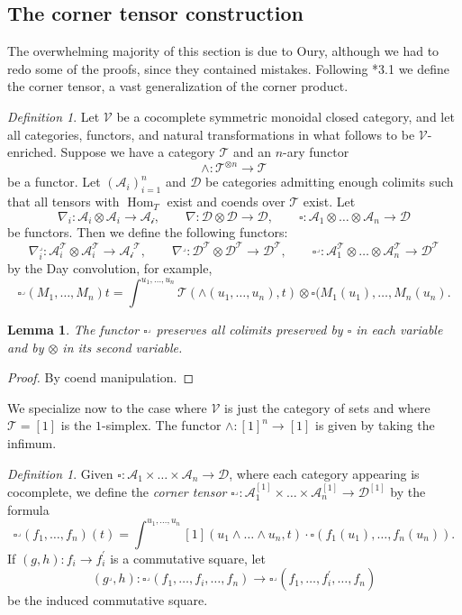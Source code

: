 \documentclass[leqno]{article}
\numberwithin{equation}{subsection}
\theoremstyle{plain}   %
\newtheorem{lemma}[equation]{Lemma}
\theoremstyle{remark}
\newtheorem{defn}[equation]{Definition}
\theoremstyle{plain}
\DeclareMathOperator{\Hom}{Hom}
\begin{document}
\subsection{The corner tensor construction}\label{cornertensor} 
The overwhelming majority of this section is due to Oury, although we had to redo some of the proofs, since they contained mistakes. Following \cite{oury}*{3.1} we define the corner tensor, a vast generalization of the corner product.
\begin{defn}
	Let \(\mathcal{V}\) be a cocomplete symmetric monoidal closed category, and let all categories, functors, and natural transformations in what follows to be \(\mathcal{V}\)-enriched.  Suppose we have a category \(\mathcal{T}\) and an \(n\)-ary functor \[\wedge:\mathcal{T}^{\otimes n} \to \mathcal{T}\] be a functor.  Let \((\mathcal{A}_i)_{i=1}^n\) and \(\mathcal{D}\) be categories admitting enough colimits such that all tensors with \(\Hom_T\) exist and coends over \(\mathcal{T}\) exist.  Let
	\[\nabla_i: \mathcal{A}_i \otimes \mathcal{A}_i \to \mathcal{A_i}, \qquad \nabla:\mathcal{D}\otimes \mathcal{D} \to \mathcal{D}, \qquad \square:\mathcal{A}_1\otimes\dots \otimes \mathcal{A}_n \to \mathcal{D}\]
	be functors.  Then we define the following functors:
	\[\nabla^\lrcorner_i: \mathcal{A}^\mathcal{T}_i \otimes \mathcal{A}^\mathcal{T}_i \to \mathcal{A_i}^\mathcal{T}, \qquad \nabla^\lrcorner:\mathcal{D}^\mathcal{T}\otimes \mathcal{D}^\mathcal{T} \to \mathcal{D}^\mathcal{T}, \qquad \square^\lrcorner: \mathcal{A}_1^\mathcal{T}\otimes\dots \otimes \mathcal{A}_n^\mathcal{T} \to \mathcal{D}^\mathcal{T}\]
	by the Day convolution, for example,
	\[\square^\lrcorner(M_1,\dots,M_n)t = \int^{u_1,\dots,u_n} \mathcal{T}(\wedge(u_1,\dots,u_n),t) \otimes \square(M_1(u_1),\dots,M_n(u_n).\]
\end{defn}
\begin{lemma}
	The functor \(\square^\lrcorner\) preserves all colimits preserved by \(\square\) in each variable and by \(\otimes\) in its second variable.  
\end{lemma}
\begin{proof} By coend manipulation.
\end{proof}
We specialize now to the case where \(\mathcal{V}\) is just the category of sets and where \(\mathcal{T}=[1]\) is the \(1\)-simplex.  The functor \(\wedge:[1]^n \to [1]\) is given by taking the infimum.   
\begin{defn}
	Given \(\square:\mathcal{A}_1\times \dots \times \mathcal{A}_n \to \mathcal{D}\), where each category appearing is cocomplete, we define the \emph{corner tensor} \(\square^\lrcorner:\mathcal{A}_1^{[1]}\times \dots \times \mathcal{A}_n^{[1]} \to \mathcal{D}^{[1]}\) by the formula
	\[\square^\lrcorner(f_1,\dots,f_n)(t)=\int^{u_1,\dots,u_n} [1](u_1\wedge\dots\wedge u_n, t) \cdot \square(f_1(u_1),\dots,f_n(u_n)).\]
	If \((g,h): f_i\to f^\prime_i\) is a commutative square, let 
	\[(g^\lrcorner,h):\square^\lrcorner(f_1,\dots,f_i,\dots,f_n) \to \square^\lrcorner(f_1,\dots,f^\prime_i,\dots,f_n) \]
	be the induced commutative square.  
\end{defn}
\end{document}
